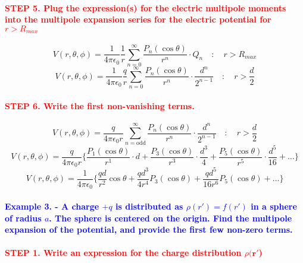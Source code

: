 \documentclass{article}
\begin{document}
\paragraph{\textcolor{red}{STEP 5. Plug the expression(s) for the electric multipole moments into the multipole expansion series for the electric potential for $r>R_{max}$}}
\begin{equation*}
    V(r,\theta,\phi)=\frac{1}{4\pi\epsilon_0}\frac{1}{r}\sum_{n=0}^{\infty}\frac{P_n(\cos\theta)}{r^n}\cdot Q_n\quad:\quad r>R_{max}
\end{equation*}
\begin{equation*}
    V(r,\theta,\phi)=\frac{1}{4\pi\epsilon_0}\frac{q}{r}\sum_{n=0}^{\infty}\frac{P_n(\cos\theta)}{r^n}\cdot\frac{d^n}{2^{n-1}}\quad:\quad r>\frac{d}{2}
\end{equation*}
\paragraph{\textcolor{red}{STEP 6. Write the first non-vanishing terms.}}
\begin{equation*}
    V(r,\theta, \phi)=\frac{q}{4\pi\epsilon_0r}\sum_{n=\text{odd}}^{\infty}\frac{P_n(\cos\theta)}{r^n}\cdot\frac{d^n}{2^{n-1}}\quad:\quad r>\frac{d}{2}
\end{equation*}
\begin{equation*}
    V(r,\theta,\phi)=\frac{q}{4\pi\epsilon_0r}\bigg\{ \frac{P_1(\cos\theta)}{r^1}\cdot d +\frac{P_3(\cos\theta)}{r^3}\cdot \frac{d^3}{4}+\frac{P_5(\cos\theta)}{r^5}\cdot \frac{d^5}{16}+\dots\bigg\}
\end{equation*}
\begin{equation*}
    V(r,\theta,\phi)=\frac{1}{4\pi\epsilon_0}\bigg\{ \frac{qd}{r^2}\cos\theta +\frac{qd^3}{4r^4}P_3(\cos\theta)+\frac{qd^5}{16r^6}P_5(\cos\theta)+\dots\bigg\}
\end{equation*}
\paragraph{\textcolor{blue}{Example 3. - A charge $+q$ is distributed as $\rho(r')=f(r')$ in a sphere of radius $a$. The sphere is centered on the origin. Find the multipole expansion of the potential, and provide the first few non-zero terms.}}
\paragraph{\textcolor{red}{STEP 1. Write an expression for the charge distribution $\rho(\boldsymbol{r}'$)}}
\end{document}
